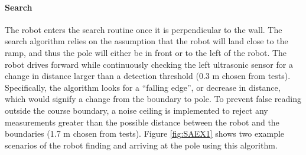 \documentclass[ece]{uw-wkrpt}
\begin{document}
\paragraph{Search}

The robot enters the search routine once it is perpendicular to the wall. The search algorithm relies on the assumption that the robot will land close to the ramp, and thus the pole will either be in front or to the left of the robot. The robot drives forward while continuously checking the left ultrasonic sensor for a change in distance larger than a detection threshold (0.3 m chosen from tests). Specifically, the algorithm looks for a “falling edge”, or decrease in distance, which would signify a change from the boundary to pole. To prevent false reading outside the course boundary, a noise ceiling is implemented to reject any measurements greater than the possible distance between the robot and the boundaries (1.7 m chosen from tests). Figure \ref{fig:SAEX1} shows two example scenarios of the robot finding and arriving at the pole using this algorithm.
\end{document}
